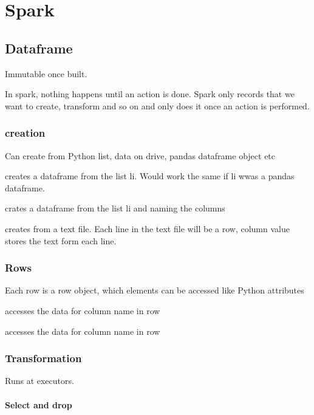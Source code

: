 \chapter{Spark}

\section{Dataframe}

	Immutable once built.


	In spark, nothing happens until an action is done. Spark only records that we want to create, transform and so on and only does it once an action is performed.

	\subsection{creation}

		Can create from Python list, data on drive, pandas dataframe object etc

		 creates a dataframe from the list li. Would work the same if li wwas a pandas dataframe.

		 crates a dataframe from the list li and naming the columns

		 creates from a text file. Each line in the text file will be a row, column value stores the text form each line.


	\subsection{Rows}

		Each row is a row object, which elements can be accessed like Python attributes

		 accesses the data for column name in row

		 accesses the data for column name in row



	\subsection{Transformation}

		Runs at executors.


			\subsubsection{Select and drop}

